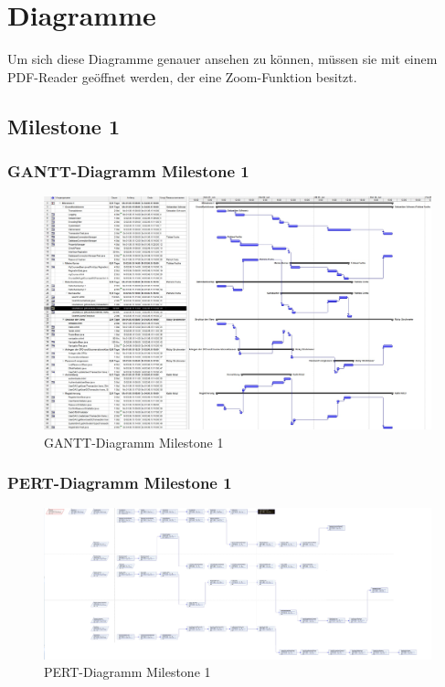 \chapter{Diagramme}
Um sich diese Diagramme genauer ansehen zu können, müssen sie mit einem PDF-Reader
geöffnet werden, der eine Zoom-Funktion besitzt.
\section{Milestone 1}
\subsection{GANTT-Diagramm Milestone 1}
 \begin{figure}[h]
 		\centering
 		\includegraphics[width=0.8\linewidth, angle=90]{Grafiken/Milestone1Gantt}
 		\caption{GANTT-Diagramm Milestone 1}
 		\label{fig:GANTT-Diagramm Milestone 1}
 \end{figure}


\clearpage
\subsection{PERT-Diagramm Milestone 1}
\begin{figure}[h]
	\centering
	\includegraphics[width=1.0\linewidth, angle=90]{Grafiken/Milestone1Pert}
	\caption{PERT-Diagramm Milestone 1}
	\label{fig:PERT-Diagramm Milestone 1}
\end{figure}
\clearpage
